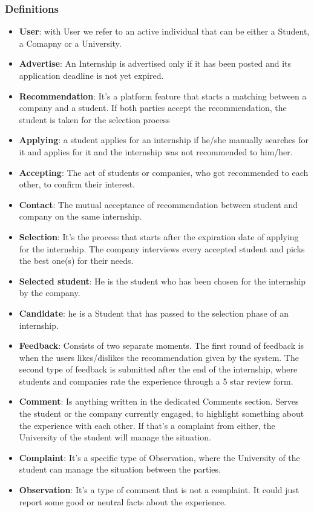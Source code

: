 \documentclass[a4paper,12pt]{article}
\begin{document}
\subsubsection{Definitions}
    \begin{itemize}
        \item \textbf{User}: with User we refer to an active individual that can be either a Student, a Comapny or a University.
        \item \textbf{Advertise}: An Internship is advertised only if it has been posted and its application deadline is not yet expired.
        \item \textbf{Recommendation}: It's a platform feature that starts a matching between a company and a student. If both parties accept the recommendation, the student is taken for the selection process
        \item \textbf{Applying}: a student applies for an internship if he/she manually searches for it and applies for it and the internship was not recommended to him/her.
        \item \textbf{Accepting}: The act of students or companies, who got recommended to each other, to confirm their interest.
        \item \textbf{Contact}: The mutual acceptance of recommendation between student and company on the same internship.
        \item \textbf{Selection}: It's the process that starts after the expiration date of applying for the internship. The company interviews every accepted student and picks the best one(s) for their needs.
        \item \textbf{Selected student}: He is the student who has been chosen for the internship by the company.
        \item \textbf{Candidate}: he is a Student that has passed to the selection phase of an internship.
        \item \textbf{Feedback}: Consists of two separate moments.
        The first round of feedback is when the users likes/dislikes the recommendation given by the system. The second type of feedback is submitted after the end of the internship, where students and companies rate the experience through a 5 star review form.
        \item \textbf{Comment}: Is anything written in the dedicated Comments section. Serves the student or the company currently engaged, to highlight something about the experience with each other. If that's a complaint from either, the University of the student will manage the situation.
        \item \textbf{Complaint}: It's a specific type of Observation, where the University of the student can manage the situation between the parties.
        \item \textbf{Observation}: It's a type of comment that is not a complaint. It could just report some good or neutral facts about the experience.
    \end{itemize}
\end{document}
